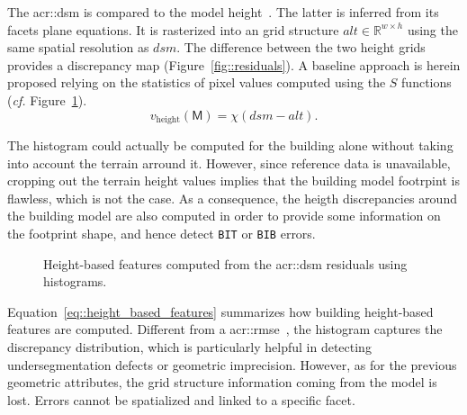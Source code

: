         The \gls{acr::dsm} is compared to the model height~\parencite{bredif20073d,zebedin2008fusion}.
        The latter is inferred from its facets plane equations.
        It is rasterized into an grid structure $alt \in \mathbb{R}^{w\times h}$ using the same spatial resolution as $dsm$.
        The difference between the two height grids provides a discrepancy map (Figure~\ref{fig::residuals}).
        A baseline approach is herein proposed relying on the statistics of pixel values computed using the $S$ functions (\textit{cf.} Figure~\ref{fig::height_based_features}).\\

        \begin{equation}
            \label{eq::height_based_features}
            v_{\text{height}}\left(\mathsf{M}\right) = \chi \left( dsm - alt \right).
        \end{equation}

        The histogram could actually be computed for the building alone without taking into account the terrain arround it.
        However, since reference data is unavailable, cropping out the terrain height values implies that the building model footrpint is flawless, which is not the case.
        As a consequence, the heigth discrepancies around the building model are also computed in order to provide some information on the footprint shape, and hence detect \texttt{BIT} or \texttt{BIB} errors.\\
        
        \begin{figure}[htpb]
            \centering
            
            \caption{
                \label{fig::height_based_features}
                Height-based features computed from the \gls{acr::dsm} residuals using histograms.
            }
        \end{figure}

        Equation~\ref{eq::height_based_features} summarizes how building height-based features are computed.
        Different from a \gls{acr::rmse}~\parencite{lafarge2012creating,poullis2013framework}, the histogram captures the discrepancy distribution, which is particularly helpful in detecting undersegmentation defects or geometric imprecision.
        However, as for the previous geometric attributes, the grid structure information coming from the model is lost.
        Errors cannot be spatialized and linked to a specific facet.

